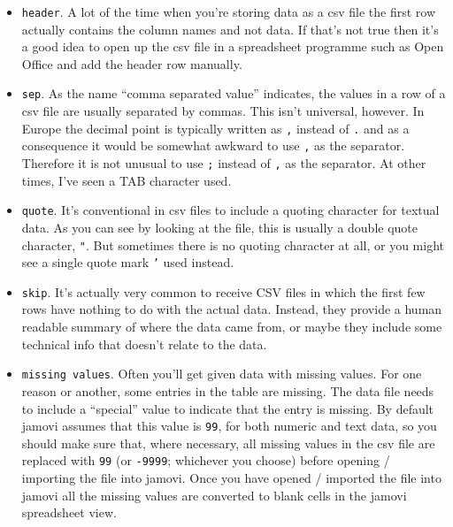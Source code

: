 \begin{itemize}
\item \texttt{header}. A lot of the time when you're storing data as a csv file the first row actually contains the column names and not data. If that's not true then it's a good idea to open up the csv file in a spreadsheet programme such as Open Office and add the header row manually. 
\item \texttt{sep}. As the name ``comma separated value'' indicates, the values in a row of a csv file are usually separated by commas. This isn't universal, however. In Europe the decimal point is typically written as \texttt{,} instead of \texttt{.} and as a consequence it would be somewhat awkward to use \texttt{,} as the separator. Therefore it is not unusual to use \texttt{;} instead of \texttt{,} as the separator. At other times, I've seen a TAB character used. 
\item \texttt{quote}. It's conventional in csv files to include a quoting character for textual data. As you can see by looking at the  file, this is usually a double quote character, \texttt{"}. But sometimes there is no quoting character at all, or you might see a single quote mark \texttt{'} used instead. 
\item \texttt{skip}. It's actually very common to receive CSV files in which the first few rows have nothing to do with the actual data. Instead, they provide a human readable summary of where the data came from, or maybe they include some technical info that doesn't relate to the data. 
\item \texttt{missing values}. Often you'll get given data with missing values. For one reason or another, some entries in the table are missing. The data file needs to include a ``special'' value to indicate that the entry is missing. By default jamovi assumes that this value is \texttt{99}, for both numeric and text data, so you should make sure that, where necessary, all missing values in the csv file are replaced with \texttt{99} (or \texttt{-9999}; whichever you choose) before opening / importing the file into jamovi. Once you have opened / imported the file into jamovi all the missing values are converted to blank cells in the jamovi spreadsheet view.
\end{itemize}

